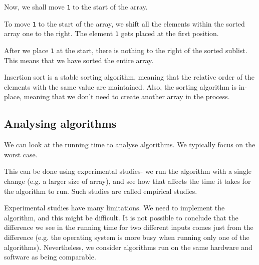 \documentclass[a4paper, openany]{memoir}
\begin{document}
Now, we shall move \texttt{1} to the start of the array.
\begin{center}
\end{center}
To move \texttt{1} to the start of the array, we shift all the elements within the sorted array one to the right. The element \texttt{1} gets placed at the first position.
\begin{center}
\end{center}
After we place \texttt{1} at the start, there is nothing to the right of the sorted sublist. This means that we have sorted the entire array.

\noindent Insertion sort is a stable sorting algorithm, meaning that the relative order of the elements with the same value are maintained. Also, the sorting algorithm is in-place, meaning that we don't need to create another array in the process.

\subsection{Analysing algorithms}
We can look at the running time to analyse algorithms. We typically focus on the worst case. 

\noindent This can be done using experimental studies- we run the algorithm with a single change (e.g. a larger size of array), and see how that affects the time it takes for the algorithm to run. Such studies are called empirical studies.

\noindent Experimental studies have many limitations. We need to implement the algorithm, and this might be difficult. It is not possible to conclude that the difference we see in the running time for two different inputs comes just from the difference (e.g. the operating system is more busy when running only one of the algorithms). Nevertheless, we consider algorithms run on the same hardware and software as being comparable.
\end{document}
